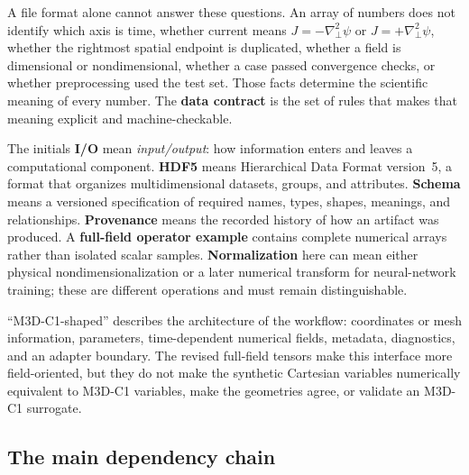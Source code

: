 \documentclass[11pt]{article}
\newcommand{\Lap}{\nabla_{\!\perp}^{2}}
\begin{document}
A file format alone cannot answer these questions. An array of numbers does not identify which axis is time, whether current means $J=-\Lap\psi$ or $J=+\Lap\psi$, whether the rightmost spatial endpoint is duplicated, whether a field is dimensional or nondimensional, whether a case passed convergence checks, or whether preprocessing used the test set. Those facts determine the scientific meaning of every number. The \textbf{data contract} is the set of rules that makes that meaning explicit and machine-checkable.

The initials \textbf{I/O} mean \emph{input/output}: how information enters and leaves a computational component. \textbf{HDF5} means Hierarchical Data Format version~5, a format that organizes multidimensional datasets, groups, and attributes. \textbf{Schema} means a versioned specification of required names, types, shapes, meanings, and relationships. \textbf{Provenance} means the recorded history of how an artifact was produced. A \textbf{full-field operator example} contains complete numerical arrays rather than isolated scalar samples. \textbf{Normalization} here can mean either physical nondimensionalization or a later numerical transform for neural-network training; these are different operations and must remain distinguishable.

\begin{warningbox}
``M3D-C1-shaped'' describes the architecture of the workflow: coordinates or mesh information, parameters, time-dependent numerical fields, metadata, diagnostics, and an adapter boundary. The revised full-field tensors make this interface more field-oriented, but they do not make the synthetic Cartesian variables numerically equivalent to M3D-C1 variables, make the geometries agree, or validate an M3D-C1 surrogate.
\end{warningbox}

\subsection*{The main dependency chain}

\begin{center}
\end{center}
\end{document}
